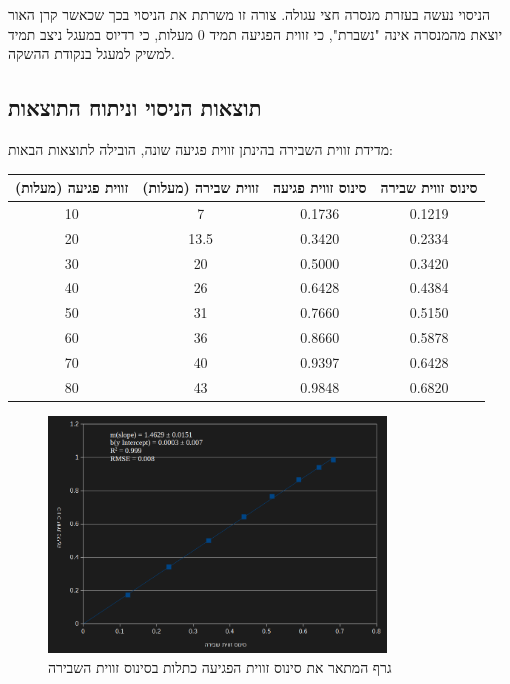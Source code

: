 \documentclass[14pt]{extarticle}
\begin{document}
הניסוי נעשה בעזרת מנסרה חצי עגולה. צורה זו משרתת את הניסוי בכך שכאשר קרן האור יוצאת מהמנסרה אינה "נשברת", כי זווית הפגיעה תמיד 0 מעלות, כי רדיוס במעגל ניצב תמיד למשיק למעגל בנקודת ההשקה.

\subsection*{תוצאות הניסוי וניתוח התוצאות}

מדידת זווית השבירה בהינתן זווית פגיעה שונה, הובילה לתוצאות הבאות:
\begin{center}
    {\normalsize
    \begin{tabular}{|c|c|c|c|}
    \hline
    זווית פגיעה (מעלות) & זווית שבירה (מעלות) & סינוס זווית פגיעה & סינוס זווית שבירה \\ \hline
    10 & 7   & 0.1736 & 0.1219 \\ \hline
    20 & 13.5 & 0.3420 & 0.2334 \\ \hline
    30 & 20  & 0.5000 & 0.3420 \\ \hline
    40 & 26  & 0.6428 & 0.4384 \\ \hline
    50 & 31  & 0.7660 & 0.5150 \\ \hline
    60 & 36  & 0.8660 & 0.5878 \\ \hline
    70 & 40  & 0.9397 & 0.6428 \\ \hline
    80 & 43  & 0.9848 & 0.6820 \\ \hline
    \end{tabular}
    }
\end{center}

\begin{figure}[ht]
  \centering
  \includegraphics[width=0.8\textwidth]{Lab_1_Experiment_1.png}
  \caption{גרף המתאר את סינוס זווית הפגיעה כתלות בסינוס זווית השבירה}
  \label{fig:excel_chart}
\end{figure}
\end{document}
